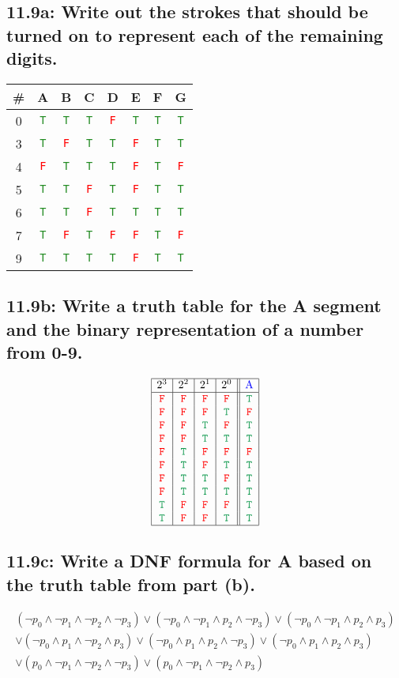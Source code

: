 \documentclass{article}
\newcommand\true{\textcolor{ForestGreen}{\texttt{T}}}
\newcommand\false{\textcolor{red}{\texttt{F}}}
\begin{document}
\subsection*{11.9a: Write out the strokes that should be turned on to represent each of the remaining digits.}
\begin{center}\begin{tabular}{|c||c|c|c|c|c|c|c|}
    \hline
    \#&A&B&C&D&E&F&G\\
    \hline
    0&\true&\true&\true&\false&\true&\true&\true\\
    3&\true&\false&\true&\true&\false&\true&\true\\
    4&\false&\true&\true&\true&\false&\true&\false\\
    5&\true&\true&\false&\true&\false&\true&\true\\
    6&\true&\true&\false&\true&\true&\true&\true\\
    7&\true&\false&\true&\false&\false&\true&\false\\
    9&\true&\true&\true&\true&\false&\true&\true\\
    \hline
\end{tabular}\end{center}
\subsection*{11.9b: Write a truth table for the A segment and the binary representation of a number from 0-9.}
\[\begin{array}{|c|c|c|c||c|}
    \hline
    2^3&2^2&2^1&2^0&\textcolor{blue}{\text{A}}\\
    \hline
    \false&\false&\false&\false&\true\\
    \false&\false&\false&\true&\false\\
    \false&\false&\true&\false&\true\\
    \false&\false&\true&\true&\true\\
    \false&\true&\false&\false&\false\\
    \false&\true&\false&\true&\true\\
    \false&\true&\true&\false&\true\\
    \false&\true&\true&\true&\true\\
    \true&\false&\false&\false&\true\\
    \true&\false&\false&\true&\true\\
    \hline
\end{array}\]
\subsection*{11.9c: Write a DNF formula for A based on the truth table from part (b).}
\begin{gather*}
  (\neg p_0\land\neg p_1\land\neg p_2\land\neg p_3)\lor(\neg p_0\land\neg p_1\land p_2\land\neg p_3)\lor(\neg p_0\land\neg p_1\land p_2\land p_3)\\\lor(\neg p_0\land p_1\land\neg p_2\land p_3)\lor(\neg p_0\land p_1\land p_2\land\neg p_3)\lor(\neg p_0\land p_1\land p_2\land p_3)\\\lor(p_0\land\neg p_1\land\neg p_2\land\neg p_3)\lor(p_0\land\neg p_1\land\neg p_2\land p_3)
  \end{gather*}
\end{document}
